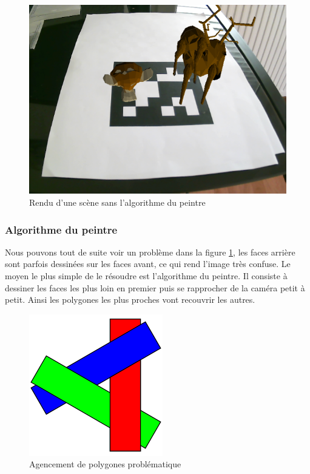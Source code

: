                \begin{figure}[!h]
                    \centering
                    \includegraphics[scale=0.45]{img/rendu/sans_peintre.png}
                    \caption{Rendu d'une scène sans l'algorithme du peintre}
                    \label{fig:sans_peintre}
                \end{figure}
                
            \subsubsection{Algorithme du peintre}
                Nous pouvons tout de suite voir un problème dans la figure \ref{fig:sans_peintre}, les faces arrière sont parfois dessinées sur les faces avant, ce qui rend l'image très confuse. Le moyen le plus simple de le résoudre est l'algorithme du peintre. Il consiste à dessiner les faces les plus loin en premier puis se rapprocher de la caméra petit à petit. Ainsi les polygones les plus proches vont recouvrir les autres. 

                \begin{figure}[!h]
                    \centering
                    \includegraphics[scale=0.3]{img/rendu/peintre_probleme.png}
                    \caption{Agencement de polygones problématique}
                    \label{fig:peintre_probleme}
                \end{figure}

